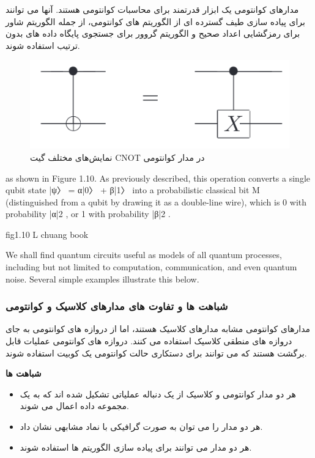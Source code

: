 \documentclass{book}
\begin{document}
مدارهای کوانتومی یک ابزار قدرتمند برای محاسبات کوانتومی هستند. آنها می توانند برای پیاده سازی طیف گسترده ای از الگوریتم های کوانتومی، از جمله الگوریتم شاور برای رمزگشایی اعداد صحیح و الگوریتم گروور برای جستجوی پایگاه داده های بدون ترتیب استفاده شوند.


\begin{figure}[htbp]
	\centering
	\includegraphics[width=\linewidth]{cnot in circuit.png}
	\caption{نمایش‌های مختلف گیت CNOT در مدار کوانتومی}
	\label{fig:my_image}
\end{figure}


as shown in Figure 1.10. As previously described, this operation converts a single qubit
state |ψ〉 = α|0〉 + β|1〉 into a probabilistic classical bit M (distinguished from a qubit by
drawing it as a double-line wire), which is 0 with probability |α|2 , or 1 with probability
|β|2 .


fig1.10 L chuang book

We shall find quantum circuits useful as models of all quantum processes, including
but not limited to computation, communication, and even quantum noise. Several simple
examples illustrate this below.
\subsubsection{شباهت ها و تفاوت های مدارهای کلاسیک و کوانتومی}
مدارهای کوانتومی مشابه مدارهای کلاسیک هستند، اما از دروازه های کوانتومی به جای دروازه های منطقی کلاسیک استفاده می کنند. دروازه های کوانتومی عملیات قابل برگشت هستند که می توانند برای دستکاری حالت کوانتومی یک کوبیت استفاده شوند.

\textbf{شباهت ها}

\begin{itemize}
	\item هر دو مدار کوانتومی و کلاسیک از یک دنباله عملیاتی تشکیل شده اند که به یک مجموعه داده اعمال می شوند.
	\item هر دو مدار را می توان به صورت گرافیکی با نماد مشابهی نشان داد.
	\item هر دو مدار می توانند برای پیاده سازی الگوریتم ها استفاده شوند.
\end{itemize}
\end{document}
